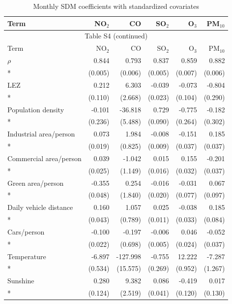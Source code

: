 \begin{longtable}{lrrrrr}
\caption{Monthly SDM coefficients with standardized covariates}\label{tab:s_coefficients}\\
\toprule
Term & NO$_2$ & CO & SO$_2$ & O$_3$ & PM$_{10}$ \\
\midrule\endfirsthead
\multicolumn{6}{c}{Table S4 (continued)}\\
\toprule
Term & NO$_2$ & CO & SO$_2$ & O$_3$ & PM$_{10}$ \\
\midrule\endhead
\bottomrule\endfoot
$\rho$ & 0.844 & 0.793 & 0.837 & 0.859 & 0.882 \\*
 & (0.005) & (0.006) & (0.005) & (0.007) & (0.006) \\
\addlinespace[1pt]
LEZ & 0.212 & 6.303 & -0.039 & -0.073 & -0.804 \\*
 & (0.110) & (2.668) & (0.023) & (0.104) & (0.290) \\
\addlinespace[1pt]
Population density & -0.101 & -36.818 & 0.729 & -0.775 & -0.182 \\*
 & (0.236) & (5.488) & (0.090) & (0.264) & (0.302) \\
\addlinespace[1pt]
Industrial area/person & 0.073 & 1.984 & -0.008 & -0.151 & 0.185 \\*
 & (0.019) & (0.825) & (0.009) & (0.037) & (0.037) \\
\addlinespace[1pt]
Commercial area/person & 0.039 & -1.042 & 0.015 & 0.155 & -0.201 \\*
 & (0.025) & (1.149) & (0.016) & (0.032) & (0.037) \\
\addlinespace[1pt]
Green area/person & -0.355 & 0.254 & -0.016 & -0.031 & 0.067 \\*
 & (0.048) & (1.840) & (0.020) & (0.077) & (0.097) \\
\addlinespace[1pt]
Daily vehicle distance & 0.160 & 1.057 & 0.025 & -0.038 & 0.185 \\*
 & (0.043) & (0.789) & (0.011) & (0.033) & (0.084) \\
\addlinespace[1pt]
Cars/person & -0.100 & -0.197 & -0.006 & 0.046 & -0.052 \\*
 & (0.022) & (0.698) & (0.005) & (0.024) & (0.037) \\
\addlinespace[1pt]
Temperature & -6.897 & -127.998 & -0.755 & 12.222 & -7.287 \\*
 & (0.534) & (15.575) & (0.269) & (0.952) & (1.267) \\
\addlinespace[1pt]
Sunshine & 0.280 & 9.382 & 0.086 & -0.419 & 0.017 \\*
 & (0.124) & (2.519) & (0.041) & (0.120) & (0.130) \\

\end{longtable}
